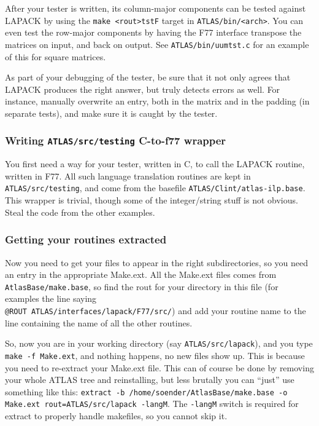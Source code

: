 \documentclass[11pt]{article}
\begin{document}
After your tester is written, its column-major components can be tested
against LAPACK by using the {\tt make <rout>tstF} target in
{\tt ATLAS/bin/<arch>}.  You can even test the row-major components by
having the F77 interface transpose the matrices on input, and back on 
output.  See {\tt ATLAS/bin/uumtst.c} for an example of this for square
matrices.

As part of your debugging of the tester, be sure that it not only agrees
that LAPACK produces the right answer, but truly detects errors as well.
For instance, manually overwrite an entry, both in the matrix and in the
padding (in separate tests), and make sure it is caught by the tester.

\subsubsection{Writing {\tt ATLAS/src/testing} C-to-f77 wrapper}
You first need a way for your tester, written in C, to call the LAPACK
routine, written in F77.  All such language translation routines are
kept in {\tt ATLAS/src/testing}, and come from the basefile
{\tt ATLAS/Clint/atlas-ilp.base}.  This wrapper is trivial, though
some of the integer/string stuff is not obvious.  Steal the code from
the other examples.

\subsubsection{Getting your routines extracted}
Now you need to get your files to appear in the right subdirectories,
so you need an entry in the appropriate Make.ext.
All the Make.ext files comes from {\tt AtlasBase/make.base},
so find the rout for your
directory in this file (for examples the line saying \\
{\tt @ROUT ATLAS/interfaces/lapack/F77/src/}) and add your routine name
to the line containing the name of all the other routines.

So, now you are in your working directory (say {\tt ATLAS/src/lapack}),
and you type {\tt make -f Make.ext}, and nothing happens, no new files show up. 
This is because
you need to re-extract your Make.ext file. This can of course be done by
removing your whole ATLAS tree and reinstalling, but less brutally you
can ``just'' use something like this: {\tt extract -b
/home/soender/AtlasBase/make.base -o Make.ext rout=ATLAS/src/lapack
-langM}. The {\tt -langM} switch is required for extract to properly
handle makefiles, so you cannot skip it.
\end{document}
